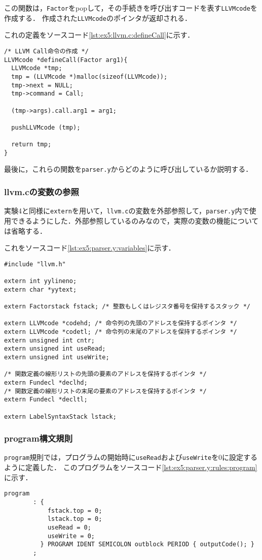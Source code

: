 \documentclass[uplatex]{jsarticle}
\begin{document}
この関数は，\verb#Factor#をpopして，その手続きを呼び出すコードを表す\verb#LLVMcode#を作成する．
作成された\verb#LLVMcode#のポインタが返却される．

これの定義をソースコード\ref{lst:ex5:llvm.c:defineCall}に示す．

\begin{lstlisting}[caption=defineCall関数の定義,label=lst:ex5:llvm.c:defineCall]
/* LLVM Call命令の作成 */
LLVMcode *defineCall(Factor arg1){
  LLVMcode *tmp;
  tmp = (LLVMcode *)malloc(sizeof(LLVMcode));
  tmp->next = NULL;
  tmp->command = Call;

  (tmp->args).call.arg1 = arg1;

  pushLLVMcode (tmp);

  return tmp;
}
\end{lstlisting}

最後に，これらの関数を\verb#parser.y#からどのように呼び出しているか説明する．

\subsubsection{llvm.cの変数の参照}
実験4と同様に\verb#extern#を用いて，\verb#llvm.c#の変数を外部参照して，\verb#parser.y#内で使用できるようにした．外部参照しているのみなので，実際の変数の機能については省略する．

これをソースコード\ref{lst:ex5:parser.y:variables}に示す．

\begin{lstlisting}[caption=変数の外部参照,label=lst:ex5:parser.y:variables]
#include "llvm.h"

extern int yylineno;
extern char *yytext;

extern Factorstack fstack; /* 整数もしくはレジスタ番号を保持するスタック */

extern LLVMcode *codehd; /* 命令列の先頭のアドレスを保持するポインタ */
extern LLVMcode *codetl; /* 命令列の末尾のアドレスを保持するポインタ */
extern unsigned int cntr;
extern unsigned int useRead;
extern unsigned int useWrite;

/* 関数定義の線形リストの先頭の要素のアドレスを保持するポインタ */
extern Fundecl *declhd;
/* 関数定義の線形リストの末尾の要素のアドレスを保持するポインタ */
extern Fundecl *decltl;

extern LabelSyntaxStack lstack;
\end{lstlisting}

\subsubsection{program構文規則}
\verb#program#規則では，プログラムの開始時に\verb#useRead#および\verb#useWrite#を0に設定するように定義した．
このプログラムをソースコード\ref{lst:ex5:parser.y:rules:program}に示す．
\begin{lstlisting}[caption=programの処理,label=lst:ex5:parser.y:rules:program]
program
        : {
            fstack.top = 0;
            lstack.top = 0;
            useRead = 0;
            useWrite = 0;
          } PROGRAM IDENT SEMICOLON outblock PERIOD { outputCode(); }
        ;
\end{lstlisting}
\end{document}
